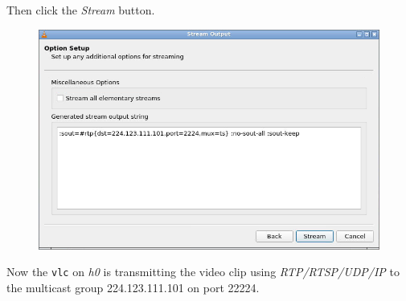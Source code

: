 \documentclass{../UTNetLab}
\begin{document}
    Then click the \textit{Stream} button.
    \begin{figure}[H]
        \centering
        \includegraphics[scale=1.7]{img/stream5}
    \end{figure}
    Now the \lstinline{vlc} on \textit{h0} is transmitting the video clip using \textit{RTP/RTSP/UDP/IP} to the multicast group {224.123.111.101} on port {22224}. 
\end{document}
